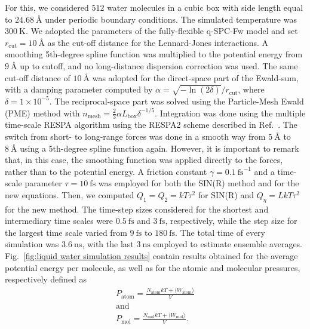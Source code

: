 \documentclass[
aip,
jcp,
reprint,
]{revtex4-1}
\begin{document}
For this, we considered $512$ water molecules in a cubic box with side length equal to $24.68~\text{\AA}$ under periodic boundary conditions.
The simulated temperature was $300~\mathrm{K}$.
We adopted the parameters of the fully-flexible q-SPC-Fw model \cite{Paesani_2006} and set $r_\mathrm{cut} = 10~\text{\AA}$ as the cut-off distance for the Lennard-Jones interactions.
A smoothing 5th-degree spline function was multiplied to the potential energy from $9~\text{\AA}$ up to cutoff, and no long-distance dispersion correction was used.
The same cut-off distance of $10~\text{\AA}$ was adopted for the direct-space part of the Ewald-sum, with a damping parameter computed by $\alpha = {\sqrt{-\ln(2\delta)}}/{r_\mathrm{cut}}$, where $\delta = 1\times10^{-5}$.
The reciprocal-space part was solved using the Particle-Mesh Ewald (PME) method with $n_\mathrm{mesh} = \frac{2}{3} \alpha L_\mathrm{box} \delta^{-1/5}$.
Integration was done using the multiple time-scale RESPA algorithm using the RESPA2 scheme described in Ref.~.
The switch from short- to long-range forces was done in a smooth way from $5~\text{\AA}$ to $8~\text{\AA}$ using a 5th-degree spline function again.
However, it is important to remark that, in this case, the smoothing function was applied directly to the forces, rather than to the potential energy.
A friction constant $\gamma = 0.1~\mathrm{fs}^{-1}$ and a time-scale parameter $\tau = 10~\mathrm{fs}$ was employed for both the SIN(R) method and for the new equations.
Then, we computed $Q_1 = Q_2 = kT \tau^2$ for SIN(R) and $Q_\eta = L kT \tau^2$ for the new method.
The time-step sizes considered for the shortest and intermediary time scales were $0.5~\mathrm{fs}$ and $3~\mathrm{fs}$, respectively, while the step size for the largest time scale varied from $9~\mathrm{fs}$ to $180~\mathrm{fs}$.
The total time of every simulation was $3.6~\mathrm{ns}$, with the last $3~\mathrm{ns}$ employed to estimate ensemble averages.
Fig.~\ref{fig:liquid water simulation results} contain results obtained for the average potential energy per molecule, as well as for the atomic and  molecular pressures, respectively defined as
\begin{multline}
P_\mathrm{atom} = \frac{N_\mathrm{atom} kT + \langle W_\mathrm{atom} \rangle}{V}
\\ \mathrm{and} \\
P_\mathrm{mol} = \frac{N_\mathrm{mol} kT + \langle W_\mathrm{mol} \rangle}{V}.
\end{multline}
\end{document}
